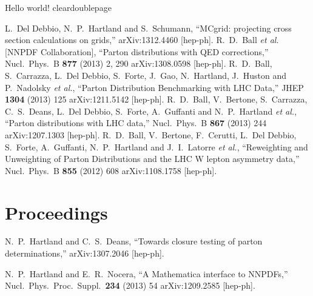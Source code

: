 \documentclass{article}
\begin{document}
Hello world!
\nocite{*}
cleardoublepage
\begin{refsection}
\renewcommand{\bibname}{Publications}
\begin{thebibliography}{10}

  L.~Del Debbio, N.~P.~Hartland and S.~Schumann,
  ``MCgrid: projecting cross section calculations on grids,''
  arXiv:1312.4460 [hep-ph].
  R.~D.~Ball {\it et al.}  [NNPDF Collaboration],
  ``Parton distributions with QED corrections,''
  Nucl.\ Phys.\ B {\bf 877} (2013) 2,  290
  arXiv:1308.0598 [hep-ph].
  R.~D.~Ball, S.~Carrazza, L.~Del Debbio, S.~Forte, J.~Gao, N.~Hartland, J.~Huston and P.~Nadolsky {\it et al.},
  ``Parton Distribution Benchmarking with LHC Data,''
  JHEP {\bf 1304} (2013) 125
  arXiv:1211.5142 [hep-ph].
  R.~D.~Ball, V.~Bertone, S.~Carrazza, C.~S.~Deans, L.~Del Debbio, S.~Forte, A.~Guffanti and N.~P.~Hartland {\it et al.},
  ``Parton distributions with LHC data,''
  Nucl.\ Phys.\ B {\bf 867} (2013) 244
  arXiv:1207.1303 [hep-ph].
  R.~D.~Ball, V.~Bertone, F.~Cerutti, L.~Del Debbio, S.~Forte, A.~Guffanti, N.~P.~Hartland and J.~I.~Latorre {\it et al.},
  ``Reweighting and Unweighting of Parton Distributions and the LHC W lepton asymmetry data,''
  Nucl.\ Phys.\ B {\bf 855} (2012) 608
  arXiv:1108.1758 [hep-ph].

\section{Proceedings}
\vspace{-.1275in}

  N.~P.~Hartland and C.~S.~Deans,
  ``Towards closure testing of parton determinations,''
  arXiv:1307.2046 [hep-ph].

  N.~P.~Hartland and E.~R.~Nocera,
  ``A Mathematica interface to NNPDFs,''
  Nucl.\ Phys.\ Proc.\ Suppl.\  {\bf 234} (2013) 54
  arXiv:1209.2585 [hep-ph].


\end{thebibliography}
\end{refsection}
\end{document}
